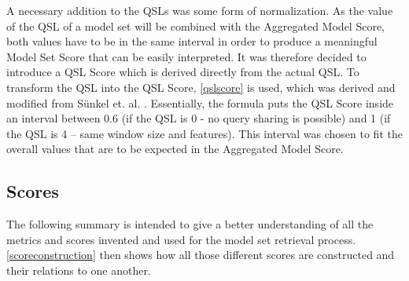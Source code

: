 A necessary addition to the QSLs was some form of normalization. As the value of the QSL of a model set will be combined with the Aggregated Model Score, both values have to be in the same interval in order to produce a meaningful Model Set Score that can be easily interpreted. It was therefore decided to introduce a QSL Score which is derived directly from the actual QSL. 
To transform the QSL into the QSL Score, \autoref{qslscore} is used, which was derived and modified from Sünkel et. al. \cite{sunkel2022}. Essentially, the formula puts the QSL Score inside an interval between 0.6 (if the QSL is 0 - no query sharing is possible) and 1 (if the QSL is 4 – same window size and features). This interval was chosen to fit the overall values that are to be expected in the Aggregated Model Score. 

\subsection{Scores}\label{sec:scores}

The following summary is intended to give a better understanding of all the metrics and scores invented and used for the model set retrieval process. \autoref{scoreconstruction} then shows how all those different scores are constructed and their relations to one another.


